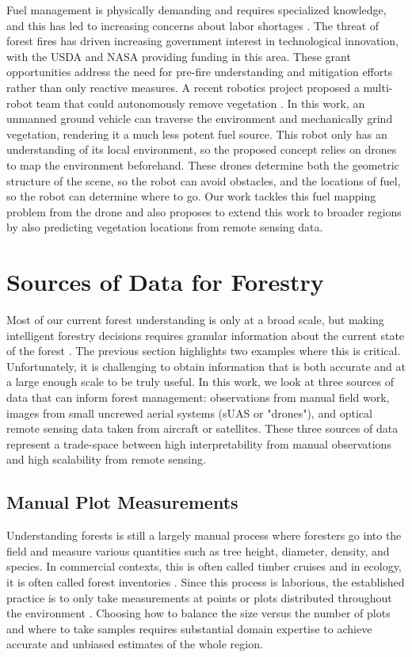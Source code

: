 Fuel management is physically demanding and requires specialized knowledge, and this has led to increasing concerns about labor shortages \cite{CommisionGlobalDivision}. 
The threat of forest fires has driven increasing government interest in technological innovation, with the USDA \cite{USDA2023USDAGrant} and NASA \cite{SPSO2023Research2023} providing funding in this area. These grant opportunities address the need for pre-fire understanding and mitigation efforts rather than only reactive measures.
A recent robotics project proposed a multi-robot team that could autonomously remove vegetation \cite{couceiro2019semfire}. In this work, an unmanned ground vehicle can traverse the environment and mechanically grind vegetation, rendering it a much less potent fuel source. This robot only has an understanding of its local environment, so the proposed concept relies on drones to map the environment beforehand. These drones determine both the geometric structure of the scene, so the robot can avoid obstacles, and the locations of fuel, so the robot can determine where to go. Our work tackles this fuel mapping problem from the drone and also proposes to extend this work to broader regions by also predicting vegetation locations from remote sensing data. 


\section{Sources of Data for Forestry}
Most of our current forest understanding is only at a broad scale\cite{Oswalt2014Update:}, but making intelligent forestry decisions requires granular information about the current state of the forest \cite{digitalForestry2009, Hogland2014EstimatingArcObjects}. The previous section highlights two examples where this is critical. Unfortunately, it is challenging to obtain information that is both accurate and at a large enough scale to be truly useful. In this work, we look at three sources of data that can inform forest management: observations from manual field work, images from small uncrewed aerial systems (sUAS or "drones"), and optical remote sensing data taken from aircraft or satellites. These three sources of data represent a trade-space between high interpretability from manual observations and high scalability from remote sensing.

\subsection{Manual Plot Measurements}
Understanding forests is still a largely manual process where foresters go into the field and measure various quantities such as tree height, diameter, density, and species. In commercial contexts, this is often called timber cruises \cite{ServiceFSHHANDBOOK} and in ecology, it is often called forest inventories \cite{USForestServiceDepartmentofAgriculture2016FORESTPLOTS}. Since this process is laborious, the established practice is to only take measurements at points or plots distributed throughout the environment \cite{Town2018ForestryMethods}. Choosing how to balance the size versus the number of plots and where to take samples requires substantial  domain expertise to achieve accurate and unbiased estimates of the whole region.

